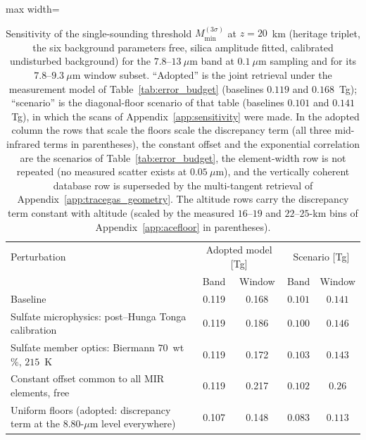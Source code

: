 \begin{table}[t]
\caption{Sensitivity of the single-sounding threshold $M_{\min}^{(3\sigma)}$ at $z=20$~km (heritage triplet, the six background parameters free, silica amplitude fitted, calibrated undisturbed background) for the $7.8$--$13~\mu$m band at $0.1~\mu$m sampling and for its $7.8$--$9.3~\mu$m window subset. ``Adopted'' is the joint retrieval under the measurement model of Table~\ref{tab:error_budget} (baselines $0.119$ and $0.168$~Tg); ``scenario'' is the diagonal-floor scenario of that table (baselines $0.101$ and $0.141$~Tg), in which the scans of Appendix~\ref{app:sensitivity} were made. In the adopted column the rows that scale the floors scale the discrepancy term (all three mid-infrared terms in parentheses), the constant offset and the exponential correlation are the scenarios of Table~\ref{tab:error_budget}, the element-width row is not repeated (no measured scatter exists at $0.05~\mu$m), and the vertically coherent database row is superseded by the multi-tangent retrieval of Appendix~\ref{app:tracegas_geometry}. The altitude rows carry the discrepancy term constant with altitude (scaled by the measured $16$--$19$ and $22$--$25$-km bins of Appendix~\ref{app:acefloor} in parentheses).}
\label{tab:robust_summary}
\centering
\footnotesize
\setlength{\tabcolsep}{4pt}
\begin{adjustbox}{max width=\textwidth}
\begin{tabular}{p{7.0cm}cccc}
\toprule
Perturbation & \multicolumn{2}{c}{Adopted model [Tg]} & \multicolumn{2}{c}{Scenario [Tg]} \\
 & Band & Window & Band & Window \\
\midrule
Baseline & 0.119 & 0.168 & $0.101$ & $0.141$ \\
\midrule
Sulfate microphysics: post--Hunga Tonga calibration & 0.119 & 0.186 & $0.100$ & $0.146$ \\
Sulfate member optics: Biermann $70$~wt\,\%, $215$~K & 0.119 & 0.172 & $0.103$ & $0.143$ \\
Constant offset common to all MIR elements, free & 0.119 & 0.217 & $0.102$ & $0.26$ \\
Uniform floors (adopted: discrepancy term at the $8.80$-$\mu$m level everywhere) & 0.107 & 0.148 & $0.083$ & $0.113$ \\

\end{tabular}
\end{adjustbox}
\end{table}
